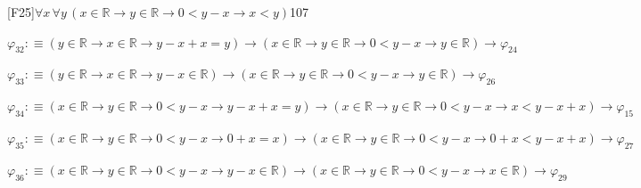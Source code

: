 \begin{fullproof}{[F25]}{$\forall x\,\forall y\,(x \in \mathbb{R} \to y \in \mathbb{R} \to 0 < y - x \to x < y)$}{107}
\begin{abbrevlist}
\item $\varphi_{32} :\equiv (y \in \mathbb{R} \to x \in \mathbb{R} \to y - x + x = y) \to (x \in \mathbb{R} \to y \in \mathbb{R} \to 0 < y - x \to y \in \mathbb{R}) \to \varphi_{24}$
\item $\varphi_{33} :\equiv (y \in \mathbb{R} \to x \in \mathbb{R} \to y - x \in \mathbb{R}) \to (x \in \mathbb{R} \to y \in \mathbb{R} \to 0 < y - x \to y \in \mathbb{R}) \to \varphi_{26}$
\item $\varphi_{34} :\equiv (x \in \mathbb{R} \to y \in \mathbb{R} \to 0 < y - x \to y - x + x = y) \to (x \in \mathbb{R} \to y \in \mathbb{R} \to 0 < y - x \to x < y - x + x) \to \varphi_{15}$
\item $\varphi_{35} :\equiv (x \in \mathbb{R} \to y \in \mathbb{R} \to 0 < y - x \to 0 + x = x) \to (x \in \mathbb{R} \to y \in \mathbb{R} \to 0 < y - x \to 0 + x < y - x + x) \to \varphi_{27}$
\item $\varphi_{36} :\equiv (x \in \mathbb{R} \to y \in \mathbb{R} \to 0 < y - x \to y - x \in \mathbb{R}) \to (x \in \mathbb{R} \to y \in \mathbb{R} \to 0 < y - x \to x \in \mathbb{R}) \to \varphi_{29}$
\end{abbrevlist}
\end{fullproof}
